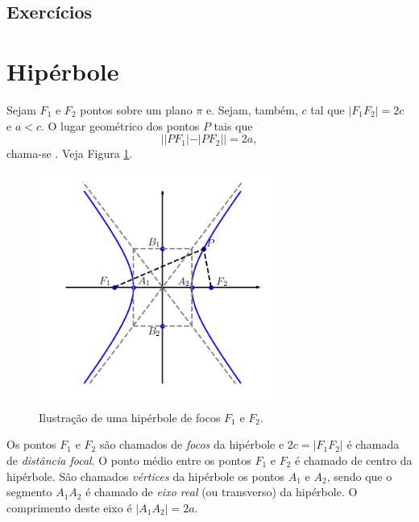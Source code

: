 \emconstrucao

\subsection*{Exercícios}

\emconstrucao

\section{Hipérbole}\label{cap_conicas_sec_hiperbole}

Sejam $F_1$ e $F_2$ pontos sobre um plano $\pi$ e. Sejam, também, $c$ tal que $|F_1F_2|=2c$ e $a<c$. O lugar geométrico dos pontos $P$ tais que
\begin{equation}
  ||PF_1|-|PF_2||=2a,
\end{equation}
chama-se . Veja Figura \ref{fig:hiperbole}.

\begin{figure}[H]
  \centering
  \includegraphics[width=0.7\textwidth]{./cap_conicas/dados/fig_hiperbole/fig_hiperbole}
  \caption{Ilustração de uma hipérbole de focos $F_1$ e $F_2$.}
  \label{fig:hiperbole}
\end{figure}

Os pontos $F_1$ e $F_2$ são chamados de \emph{focos} da hipérbole e $2c = |F_1F_2|$ é chamada de \emph{distância focal}. O ponto médio entre os pontos $F_1$ e $F_2$ é chamado de centro da hipérbole. São chamados \emph{vértices} da hipérbole os pontos $A_1$ e $A_2$, sendo que o segmento $A_1A_2$ é chamado de \emph{eixo real} (ou transverso) da hipérbole. O comprimento deste eixo é $|A_1A_2|=2a$.

